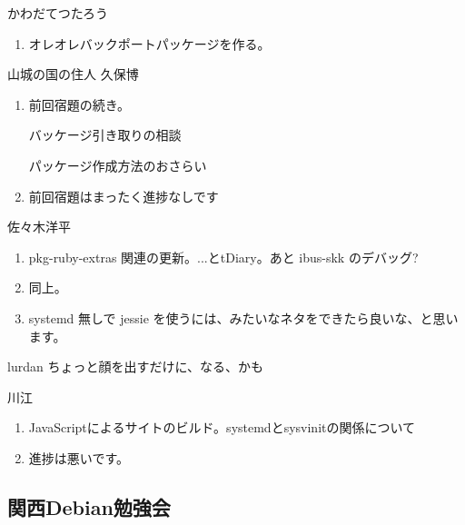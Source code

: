 \documentclass[mingoth,a4paper]{jsarticle}
\begin{document}
\begin{prework}{ かわだてつたろう }
  \begin{enumerate}
  \item オレオレバックポートパッケージを作る。
  \end{enumerate}
\end{prework}

\begin{prework}{ 山城の国の住人 久保博 }

  \begin{enumerate}
  \item 前回宿題の続き。

    バッケージ引き取りの相談

    パッケージ作成方法のおさらい

  \item 前回宿題はまったく進捗なしです

  \end{enumerate}
\end{prework}

\begin{prework}{ 佐々木洋平 }
  \begin{enumerate}
  \item pkg-ruby-extras 関連の更新。...とtDiary。あと ibus-skk のデバッグ?
  \item 同上。
  \item systemd 無しで jessie を使うには、みたいなネタをできたら良いな、と思います。
  \end{enumerate}
\end{prework}

\begin{prework}{ lurdan }
  ちょっと顔を出すだけに、なる、かも
\end{prework}

\begin{prework}{ 川江 }
  \begin{enumerate}
  \item JavaScriptによるサイトのビルド。systemdとsysvinitの関係について
  \item 進捗は悪いです。
  \end{enumerate}
\end{prework}



\subsection{関西Debian勉強会}
\end{document}
